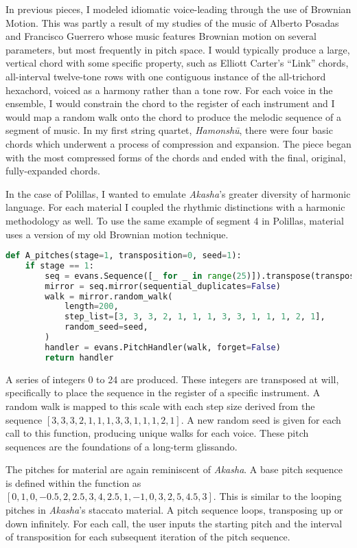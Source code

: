 In previous pieces, I modeled idiomatic voice-leading through the use of Brownian Motion. This was partly a result of my studies of the music of Alberto Posadas and Francisco Guerrero whose music features Brownian motion on several parameters, but most frequently in pitch space. I would typically produce a large, vertical chord with some specific property, such as Elliott Carter's ``Link'' chords, all-interval twelve-tone rows with one contiguous instance of the all-trichord hexachord, voiced as a harmony rather than a tone row. For each voice in the ensemble, I would constrain the chord to the register of each instrument and I would map a random walk onto the chord to produce the melodic sequence of a segment of music. In my first string quartet, \textit{Hamonshū}, there were four basic chords which underwent a process of compression and expansion. The piece began with the most compressed forms of the chords and ended with the final, original, fully-expanded chords.

In the case of Polillas, I wanted to emulate \textit{Akasha}'s greater diversity of harmonic language. For each material I coupled the rhythmic distinctions with a harmonic methodology as well. To use the same example of segment 4 in Polillas, material  uses a version of my old Brownian motion technique.

\begin{lstlisting}[language=Python,frame=tb,caption={Material A pitches in Polillas},label=lst:p-a-pitch]
def A_pitches(stage=1, transposition=0, seed=1):
    if stage == 1:
        seq = evans.Sequence([_ for _ in range(25)]).transpose(transposition)
        mirror = seq.mirror(sequential_duplicates=False)
        walk = mirror.random_walk(
            length=200,
            step_list=[3, 3, 3, 2, 1, 1, 1, 3, 3, 1, 1, 1, 2, 1],
            random_seed=seed,
        )
        handler = evans.PitchHandler(walk, forget=False)
        return handler
\end{lstlisting}

A series of integers 0 to 24 are produced. These integers are transposed at will, specifically to place the sequence in the register of a specific instrument. A random walk is mapped to this scale with each step size derived from the sequence $[3, 3, 3, 2, 1, 1, 1, 3, 3, 1, 1, 1, 2, 1]$. A new random seed is given for each call to this function, producing unique walks for each voice. These pitch sequences are the foundations of a long-term glissando.

The pitches for material  are again reminiscent of \textit{Akasha}. A base pitch sequence is defined within the function as $[0, 1, 0, -0.5, 2, 2.5, 3, 4, 2.5, 1, -1, 0, 3, 2, 5, 4.5, 3]$. This is similar to the looping pitches in \textit{Akasha}'s staccato material. A pitch sequence loops, transposing up or down infinitely. For each call, the user inputs the starting pitch and the interval of transposition for each subsequent iteration of the pitch sequence.


